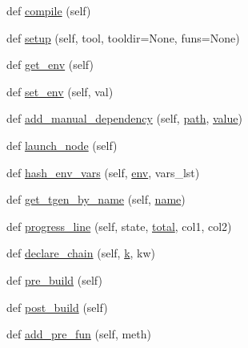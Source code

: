 \begin{DoxyCompactItemize}
\item 
def \hyperlink{classwaflib_1_1_build_1_1_build_context_af7d834423f8c49384edaf3dbaa8c912e}{compile} (self)
\item 
def \hyperlink{classwaflib_1_1_build_1_1_build_context_ad26165fd9d32fe212a94936da03066c1}{setup} (self, tool, tooldir=None, funs=None)
\item 
def \hyperlink{classwaflib_1_1_build_1_1_build_context_a39240d22a6d298b74dabc40d8fb193a8}{get\+\_\+env} (self)
\item 
def \hyperlink{classwaflib_1_1_build_1_1_build_context_a8605b754128e554773a5962b55ec0741}{set\+\_\+env} (self, val)
\item 
def \hyperlink{classwaflib_1_1_build_1_1_build_context_aa550cf2655c922455d53077b4f1e4be1}{add\+\_\+manual\+\_\+dependency} (self, \hyperlink{classwaflib_1_1_build_1_1_build_context_afe3db622272692d0069d8b0f66c54a2c}{path}, \hyperlink{lib_2expat_8h_a4a30a13b813682e68c5b689b45c65971}{value})
\item 
def \hyperlink{classwaflib_1_1_build_1_1_build_context_a5ec1b12e273a3fcd437fd1e61292e8a1}{launch\+\_\+node} (self)
\item 
def \hyperlink{classwaflib_1_1_build_1_1_build_context_a4df53c421fdd1ea43eacfe0ec268fb07}{hash\+\_\+env\+\_\+vars} (self, \hyperlink{classwaflib_1_1_build_1_1_build_context_ac3b464a969bc6c898c739b6d820b2219}{env}, vars\+\_\+lst)
\item 
def \hyperlink{classwaflib_1_1_build_1_1_build_context_a158dba08b64d4a73b21a907ebe577017}{get\+\_\+tgen\+\_\+by\+\_\+name} (self, \hyperlink{lib_2expat_8h_a1b49b495b59f9e73205b69ad1a2965b0}{name})
\item 
def \hyperlink{classwaflib_1_1_build_1_1_build_context_af6341267231cfa8cabdfd595aede71fc}{progress\+\_\+line} (self, state, \hyperlink{classwaflib_1_1_build_1_1_build_context_a9242bac9596041fb6e91bd4f7cdbac51}{total}, col1, col2)
\item 
def \hyperlink{classwaflib_1_1_build_1_1_build_context_a6d24341f3d68e2a5a3987300d3d017fa}{declare\+\_\+chain} (self, \hyperlink{rfft2d_test_m_l_8m_adc468c70fb574ebd07287b38d0d0676d}{k}, kw)
\item 
def \hyperlink{classwaflib_1_1_build_1_1_build_context_a31b06f39986abefe3e129998b079f679}{pre\+\_\+build} (self)
\item 
def \hyperlink{classwaflib_1_1_build_1_1_build_context_aa8a25dd6bc5b621fa21d9806525e03df}{post\+\_\+build} (self)
\item 
def \hyperlink{classwaflib_1_1_build_1_1_build_context_a6ebf18db9a2bccd92de1506d261d7f03}{add\+\_\+pre\+\_\+fun} (self, meth)

\end{DoxyCompactItemize}
